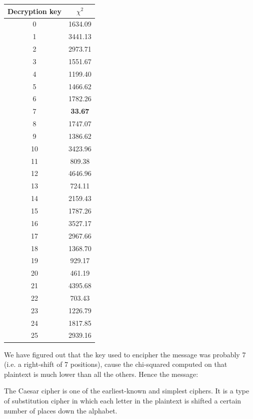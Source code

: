 \documentclass[Lau,binding=0.6cm,oneside]{sapthesis}
\begin{document}
\begin{center}
 \begin{tabular}{||c c||} 
 \hline
 Decryption key & $\chi^{2}$\\ [0.3ex] 
 \hline\hline
 0 & 1634.09\\
 \hline
 1 & 3441.13\\
 \hline
 2 & 2973.71\\
 \hline
 3 & 1551.67\\
 \hline
 4 & 1199.40\\
 \hline
 5 & 1466.62\\
 \hline
 6 & 1782.26\\
 \hline
 7 & \textbf{33.67}\\
 \hline
 8 & 1747.07\\
 \hline
 9 & 1386.62\\
 \hline
 10 & 3423.96\\
 \hline
 11 & 809.38\\
 \hline
 12 & 4646.96\\
 \hline
 13 & 724.11\\
 \hline
 14 & 2159.43\\
 \hline
 15 & 1787.26\\
 \hline
 16 & 3527.17\\
 \hline
 17 & 2967.66\\
 \hline
 18 & 1368.70\\
 \hline
 19 & 929.17\\
 \hline
 20 & 461.19\\
 \hline
 21 & 4395.68\\
 \hline
 22 & 703.43\\
 \hline
 23 & 1226.79\\
 \hline
 24 & 1817.85\\
 \hline
 25 & 2939.16\\
 \hline
\end{tabular}
\end{center}

We have figured out that the key used to encipher the message was probably 7 (i.e. a right-shift of 7 positions), cause the chi-squared computed on that plaintext is much lower than all the others. Hence the message:

\begin{displayquote}{\small{\textsf{The Caesar cipher is one of the earliest-known and simplest ciphers. It is a type of substitution cipher in which each letter in the plaintext is shifted a certain number of places down the alphabet.}}}
\end{displayquote}
\end{document}
